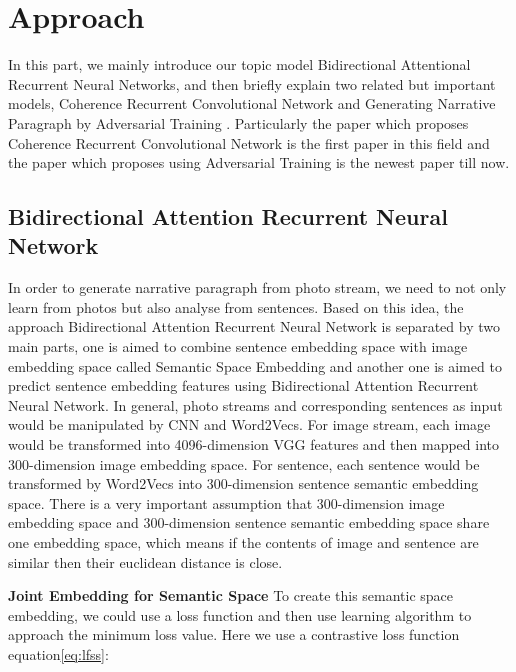 \documentclass[11pt]{article}
\begin{document}
		
		
		
\section{Approach}
In this part, we mainly introduce our topic model Bidirectional Attentional Recurrent Neural Networks, and then briefly explain two related but important models, Coherence Recurrent Convolutional Network \cite{NIPS2015_5776} and Generating Narrative Paragraph by Adversarial Training \cite{show-reward-tell-automatic-generation-narrative-paragraph-photo-stream-adversarial-training}. Particularly  the paper which proposes Coherence Recurrent Convolutional Network is the first paper in this field and the paper which proposes using Adversarial Training is the newest paper till now.

		
\subsection{Bidirectional Attention Recurrent Neural Network}
In order to generate narrative paragraph from photo stream, we need to not only learn from photos but also analyse from sentences. Based on this idea, the approach Bidirectional Attention Recurrent Neural Network is separated by two main parts, one is aimed to combine sentence embedding space with image embedding space called Semantic Space Embedding and another one is aimed to predict sentence embedding features using Bidirectional Attention Recurrent Neural Network. In general, photo streams and corresponding sentences as input would be manipulated by CNN and Word2Vecs. For image stream, each image would be transformed into 4096-dimension VGG features \cite{Simonyan14c}and then mapped into 300-dimension image embedding space. For sentence, each sentence would be transformed by Word2Vecs \cite{DBLP:journals/corr/MikolovSCCD13}into 300-dimension sentence semantic embedding space. There is a very important assumption that 300-dimension image embedding space and 300-dimension sentence semantic embedding space share one embedding space, which means if the contents of image and sentence are similar then their euclidean distance is close. 

{\bf Joint Embedding for Semantic Space}  To create this semantic space embedding, we could use a loss function and then use learning algorithm to approach the minimum loss value. Here we use a contrastive loss function equation\ref{eq:lfss}:
\end{document}
